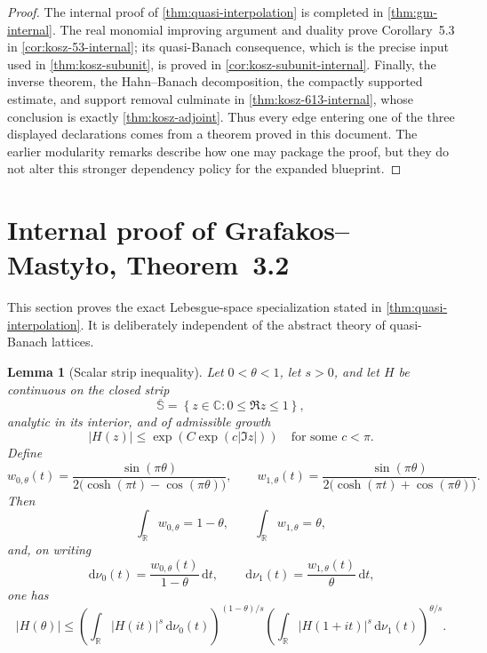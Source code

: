 \documentclass[11pt]{article}
\newtheorem{lemma}[theorem]{Lemma}
\newcommand{\R}{\mathbb{R}}
\newcommand{\Cplx}{\mathbb{C}}
\newcommand{\dd}{\,\mathrm{d}}
\newcommand{\abs}[1]{\left|#1\right|}
\newcommand{\set}[1]{\left\{#1\right\}}
\begin{document}
	\begin{proof}
		The internal proof of \cref{thm:quasi-interpolation} is completed in \cref{thm:gm-internal}.  The real monomial improving argument and duality prove Corollary~5.3 in \cref{cor:kosz-53-internal}; its quasi-Banach consequence, which is the precise input used in \cref{thm:kosz-subunit}, is proved in \cref{cor:kosz-subunit-internal}.  Finally, the inverse theorem, the Hahn--Banach decomposition, the compactly supported estimate, and support removal culminate in \cref{thm:kosz-613-internal}, whose conclusion is exactly \cref{thm:kosz-adjoint}.  Thus every edge entering one of the three displayed declarations comes from a theorem proved in this document.  The earlier modularity remarks describe how one may package the proof, but they do not alter this stronger dependency policy for the expanded blueprint.
	\end{proof}
	
	\section{Internal proof of Grafakos--Masty\l o, Theorem~3.2}\label{sec:internal-gm}
	
	This section proves the exact Lebesgue-space specialization stated in \cref{thm:quasi-interpolation}.  It is deliberately independent of the abstract theory of quasi-Banach lattices.
	
	\begin{lemma}[Scalar strip inequality]\label{lem:scalar-strip}
		Let \(0<\theta<1\), let \(s>0\), and let \(H\) be continuous on the closed strip
		\[
		\overline{\mathbb S}=\set{z\in\Cplx:0\leq\Re z\leq1},
		\]
		analytic in its interior, and of admissible growth
		\[
		\abs{H(z)}\leq \exp(C\exp(c\abs{\Im z}))
		\quad\text{for some }c<\pi.
		\]
		Define
		\[
		w_{0,\theta}(t)=
		\frac{\sin(\pi\theta)}{2\bigl(\cosh(\pi t)-\cos(\pi\theta)\bigr)},
		\qquad
		w_{1,\theta}(t)=
		\frac{\sin(\pi\theta)}{2\bigl(\cosh(\pi t)+\cos(\pi\theta)\bigr)}.
		\]
		Then
		\[
		\int_\R w_{0,\theta}=1-\theta,
		\qquad
		\int_\R w_{1,\theta}=\theta,
		\]
		and, on writing
		\[
		\dd\nu_0(t)=\frac{w_{0,\theta}(t)}{1-\theta}\dd t,
		\qquad
		\dd\nu_1(t)=\frac{w_{1,\theta}(t)}{\theta}\dd t,
		\]
		one has
		\[
		\abs{H(\theta)}
		\leq
		\left(\int_\R\abs{H(it)}^s\dd\nu_0(t)\right)^{(1-\theta)/s}
		\left(\int_\R\abs{H(1+it)}^s\dd\nu_1(t)\right)^{\theta/s}.
		\]
	\end{lemma}
	
\end{document}
